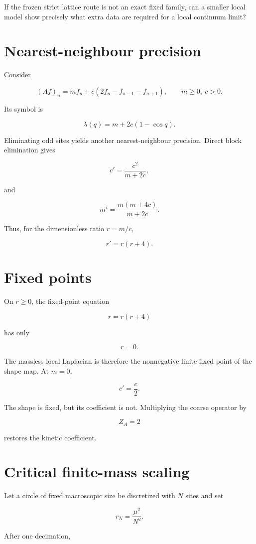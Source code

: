 \documentclass[11pt,a4paper,openany]{report}
\begin{document}
If the frozen strict lattice route is not an exact fixed family, can a smaller local model show precisely what extra data are required for a local continuum limit?

\section{Nearest-neighbour precision}

Consider

\[
(Af)_n
=
mf_n+c(2f_n-f_{n-1}-f_{n+1}),
\qquad
m\ge0,\ c>0.
\]

Its symbol is

\[
\lambda(q)=m+2c(1-\cos q).
\]

Eliminating odd sites yields another nearest-neighbour precision. Direct block elimination gives

\[
c'=\frac{c^2}{m+2c},
\]

and

\[
m'=\frac{m(m+4c)}{m+2c}.
\]

Thus, for the dimensionless ratio \(r=m/c\),

\[
r'=r(r+4).
\]

\section{Fixed points}

On \(r\ge0\), the fixed-point equation

\[
r=r(r+4)
\]

has only

\[
r=0.
\]

The massless local Laplacian is therefore the nonnegative finite fixed point of the shape map. At \(m=0\),

\[
c'=\frac c2.
\]

The shape is fixed, but its coefficient is not. Multiplying the coarse operator by

\[
Z_A=2
\]

restores the kinetic coefficient.

\section{Critical finite-mass scaling}

Let a circle of fixed macroscopic size be discretized with \(N\) sites and set

\[
r_N=\frac{\mu^2}{N^2}.
\]

After one decimation,
\end{document}
